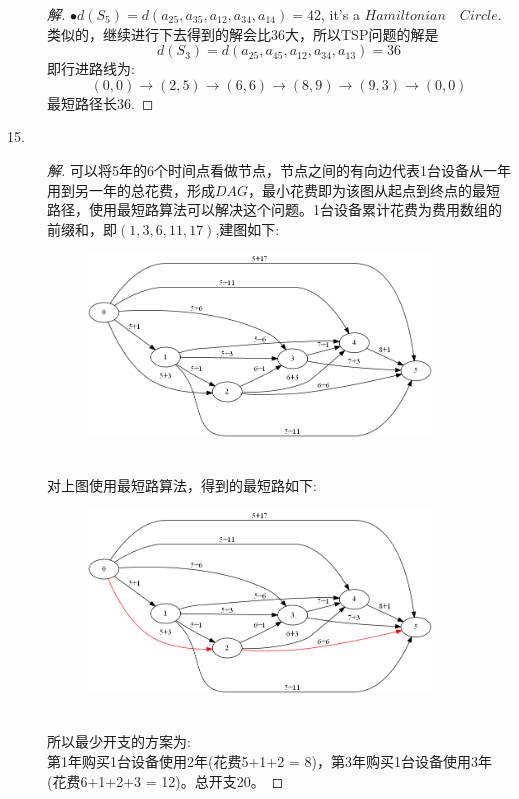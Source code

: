 \documentclass[UTF8, onecolumn, a4paper]{article}
\begin{document}
\begin{description}
\begin{proof}[解]
$\bullet$\quad$d(S_5) = d(a_{25}, a_{35}, a_{12}, a_{34}, a_{14}) = 42$, it's a $Hamiltonian\quad Circle$.\\
类似的，继续进行下去得到的解会比36大，所以TSP问题的解是$$d(S_3) = d(a_{25}, a_{45}, a_{12}, a_{34}, a_{13}) = 36$$即行进路线为:
$$(0, 0)\rightarrow(2, 5)\rightarrow(6, 6)\rightarrow(8 ,9)\rightarrow(9, 3)\rightarrow(0,0)$$
最短路径长36.
\end{proof}
\item[15.]
\begin{proof}[解]
可以将5年的6个时间点看做节点，节点之间的有向边代表1台设备从一年用到另一年的总花费，形成$DAG$，最小花费即为该图从起点到终点的最短路径，使用最短路算法可以解决这个问题。1台设备累计花费为费用数组的前缀和，即$(1, 3, 6, 11, 17)$,建图如下:
\begin{figure}[h]
	\centering
	\includegraphics[width=0.9\textwidth]{demo4.png}
\end{figure}
\\对上图使用最短路算法，得到的最短路如下:
\begin{figure}[h]
	\centering
	\includegraphics[width=0.9\textwidth]{demo5.png}
\end{figure}
\\所以最少开支的方案为:\\
第1年购买1台设备使用2年(花费5+1+2 = 8)，第3年购买1台设备使用3年(花费6+1+2+3 = 12)。总开支20。
\end{proof}


\end{description}
\end{document}
